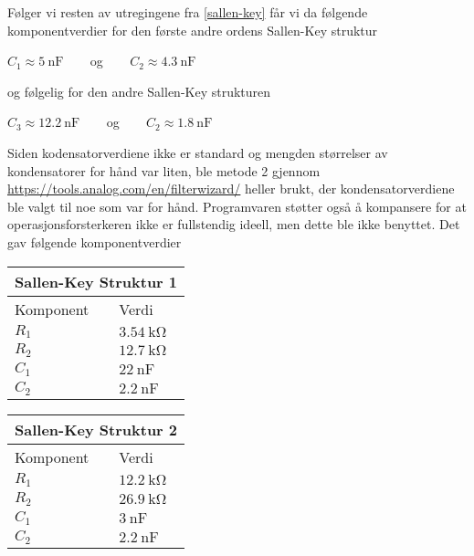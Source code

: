 Følger vi resten av utregingene fra \ref{sallen-key} får vi da følgende komponentverdier for den første 
andre ordens Sallen-Key struktur
\begin{center}
    $C_1 \approx \SI{5}{\nano\farad}\:\:\:\:\:\:\:\:$ og $\:\:\:\:\:\:\:\:C_2 \approx \SI{4.3}{\nano\farad}$
\end{center}

og følgelig for den andre Sallen-Key strukturen
\begin{center}
    $C_3 \approx \SI{12.2}{\nano\farad}\:\:\:\:\:\:\:\:$ og $\:\:\:\:\:\:\:\:C_2 \approx \SI{1.8}{\nano\farad}$
\end{center}

Siden kodensatorverdiene ikke er standard og mengden størrelser av kondensatorer for hånd var liten, ble 
metode 2 gjennom \url{https://tools.analog.com/en/filterwizard/} heller brukt, der kondensatorverdiene ble valgt 
til noe som var for hånd. Programvaren støtter også å kompansere for at operasjonsforsterkeren ikke er fullstendig 
ideell, men dette ble ikke benyttet. Det gav følgende komponentverdier

\begin{table}[h!]
    \centering
    \renewcommand{\arraystretch}{1.5}
    \begin{tabular}{|l|l|}
        \hline
        \multicolumn{2}{|l|}{\textbf{Sallen-Key Struktur 1}} \\
        \hline
        Komponent & Verdi \\
        \hline
        \( R_1 \) & \(\SI{3.54}{\kilo\ohm}\)\\
        \( R_2 \) & \(\SI{12.7}{\kilo\ohm}\)\\
        \( C_1 \) & \(\SI{22}{\nano\farad}\)\\
        \( C_2 \) & \(\SI{2.2}{\nano\farad}\)\\
        \hline
    \end{tabular}
    \vspace{1em}
    
    \begin{tabular}{|l|l|}
        \hline
        \multicolumn{2}{|l|}{\textbf{Sallen-Key Struktur 2}} \\
        \hline
        Komponent & Verdi \\
        \hline
        \( R_1 \) & \(\SI{12.2}{\kilo\ohm}\)\\
        \( R_2 \) & \(\SI{26.9}{\kilo\ohm}\)\\
        \( C_1 \) & \(\SI{3}{\nano\farad}\)\\
        \( C_2 \) & \(\SI{2.2}{\nano\farad}\)\\
        \hline
    \end{tabular}
    \vspace{1em}
\end{table}

